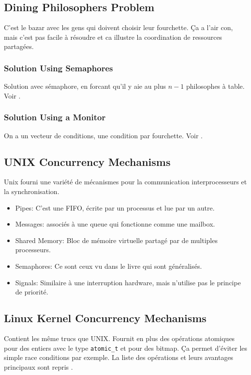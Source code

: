 \subsection{Dining Philosophers Problem}
C'est le bazar avec les gens qui doivent choisir leur fourchette.
Ça a l'air con, mais c'est pas facile à résoudre et ca illustre la coordination de ressources partagées.

\subsubsection{Solution Using Semaphores}
Solution avec sémaphore, en forcant qu'il y aie au plus $n-1$ philosophes à table.
Voir \cite[p.~281]{stallings}.

\subsubsection{Solution Using a Monitor}
On a un vecteur de conditions, une condition par fourchette.
Voir \cite[p.~282]{stallings}.

\subsection{UNIX Concurrency Mechanisms}
Unix fourni une variété de mécanismes pour la communication interprocesseurs et la synchronisation.
\begin{itemize}
  \item Pipes: C'est une FIFO, écrite par un processus et lue par un autre.
  \item Messages: associés à une queue qui fonctionne comme une mailbox.
  \item Shared Memory: Bloc de mémoire virtuelle partagé par de multiples processeurs.
  \item Semaphores: Ce sont ceux vu dans le livre qui sont généralisés.
  \item Signals: Similaire à une interruption hardware, mais n'utilise pas le principe de priorité.
\end{itemize}

\subsection{Linux Kernel Concurrency Mechanisms}
Contient les même trucs que UNIX.
Fournit en plus des opérations atomiques pour des entiers avec le type \lstinline|atomic_t|
et pour des bitmap.
Ça permet d'éviter les simple race conditions par exemple.
La liste des opérations et leurs avantages principaux sont repris \cite[p.~306-307]{stallings}.

